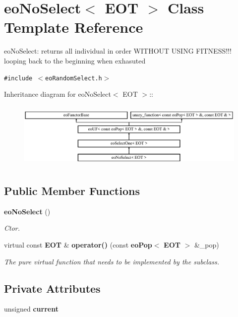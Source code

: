 \section{eo\-No\-Select$<$ EOT $>$ Class Template Reference}
\label{classeo_no_select}
eo\-No\-Select: returns all individual in order WITHOUT USING FITNESS!!! looping back to the beginning when exhasuted  


{\tt \#include $<$eo\-Random\-Select.h$>$}

Inheritance diagram for eo\-No\-Select$<$ EOT $>$::\begin{figure}[H]
\begin{center}
\leavevmode
\includegraphics[height=3.23699cm]{classeo_no_select}
\end{center}
\end{figure}
\subsection*{Public Member Functions}
\begin{CompactItemize}
\item 
{\bf eo\-No\-Select} ()\label{classeo_no_select_a0}

\begin{CompactList}\small\item\em Ctor. \item\end{CompactList}\item 
virtual const {\bf EOT} \& {\bf operator()} (const {\bf eo\-Pop}$<$ {\bf EOT} $>$ \&\_\-pop)\label{classeo_no_select_a1}

\begin{CompactList}\small\item\em The pure virtual function that needs to be implemented by the subclass. \item\end{CompactList}\end{CompactItemize}
\subsection*{Private Attributes}
\begin{CompactItemize}
\item 
unsigned {\bf current}\label{classeo_no_select_r0}

\end{CompactItemize}


